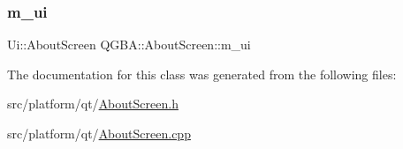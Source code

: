 \subsubsection{\texorpdfstring{m\+\_\+ui}{m\_ui}}
{\footnotesize\ttfamily Ui\+::\+About\+Screen Q\+G\+B\+A\+::\+About\+Screen\+::m\+\_\+ui\hspace{0.3cm}{\ttfamily [private]}}



The documentation for this class was generated from the following files\+:\begin{DoxyCompactItemize}
\item 
src/platform/qt/\mbox{\hyperlink{_about_screen_8h}{About\+Screen.\+h}}\item 
src/platform/qt/\mbox{\hyperlink{_about_screen_8cpp}{About\+Screen.\+cpp}}\end{DoxyCompactItemize}
